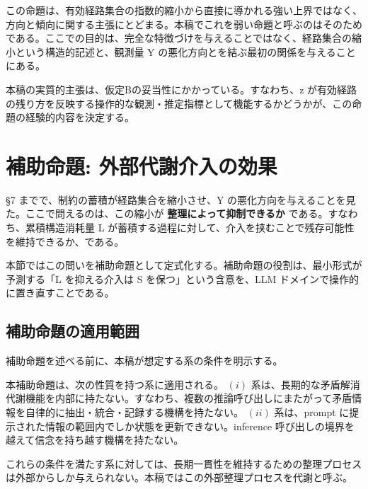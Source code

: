 \documentclass[12pt,a4paper]{article}
\begin{document}
この命題は、有効経路集合の指数的縮小から直接に導かれる強い上界ではなく、方向と傾向に関する主張にとどまる。本稿でこれを弱い命題と呼ぶのはそのためである。ここでの目的は、完全な特徴づけを与えることではなく、経路集合の縮小という構造的記述と、観測量 Y の悪化方向とを結ぶ最初の関係を与えることにある。

本稿の実質的主張は、仮定Bの妥当性にかかっている。すなわち、z が有効経路の残り方を反映する操作的な観測・推定指標として機能するかどうかが、この命題の経験的内容を決定する。

\section{補助命題: 外部代謝介入の効果}\label{ux88dcux52a9ux547dux984c-ux5916ux90e8ux4ee3ux8b1dux4ecbux5165ux306eux52b9ux679c}

§7 までで、制約の蓄積が経路集合を縮小させ、Y の悪化方向を与えることを見た。ここで問えるのは、この縮小が \textbf{整理によって抑制できるか} である。すなわち、累積構造消耗量 L が蓄積する過程に対して、介入を挟むことで残存可能性を維持できるか、である。

本節ではこの問いを補助命題として定式化する。補助命題の役割は、最小形式が予測する「L を抑える介入は S を保つ」という含意を、LLM ドメインで操作的に置き直すことである。

\subsection{補助命題の適用範囲}\label{ux88dcux52a9ux547dux984cux306eux9069ux7528ux7bc4ux56f2}

補助命題を述べる前に、本稿が想定する系の条件を明示する。

\begin{assumption}[想定する系の条件]
本補助命題は、次の性質を持つ系に適用される。
$(i)$ 系は、長期的な矛盾解消代謝機能を内部に持たない。すなわち、複数の推論呼び出しにまたがって矛盾情報を自律的に抽出・統合・記録する機構を持たない。
$(ii)$ 系は、prompt に提示された情報の範囲内でしか状態を更新できない。inference 呼び出しの境界を越えて信念を持ち越す機構を持たない。
\end{assumption}

これらの条件を満たす系に対しては、長期一貫性を維持するための整理プロセスは外部からしか与えられない。本稿ではこの外部整理プロセスを代謝と呼ぶ。
\end{document}

